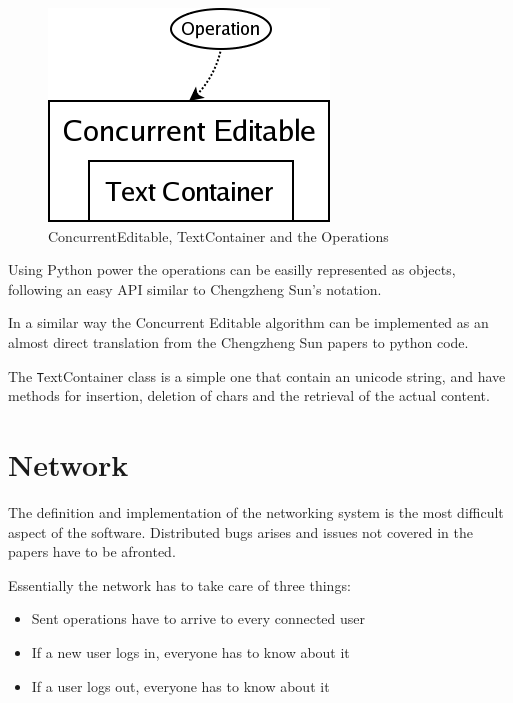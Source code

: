 \documentclass{report}
\begin{document}
\begin{figure}[htbp]
 \begin{center}
    \includegraphics[angle=0,width=0.5\linewidth]{schemas/concurrent_editable.png}
 \end{center}
 \caption{ConcurrentEditable, TextContainer and the Operations}
 \label{fig:concurrenteditable}
\end{figure}


Using Python power the operations can be easilly represented as objects, following an easy API similar to Chengzheng Sun's notation.

In a similar way the Concurrent Editable algorithm can be implemented as an almost direct translation from the Chengzheng Sun papers to python code.

The {\texttt TextContainer } class is a simple one that contain an unicode string, and have methods for insertion, deletion of chars and the retrieval of the actual content.
\section{Network}

The definition and implementation of the networking system is the most difficult aspect of the software. Distributed bugs arises and issues not covered in the papers have to be afronted.

Essentially the network has to take care of three things:
\begin{itemize}
\item Sent operations have to arrive to every connected user
\item If a new user logs in, everyone has to know about it
\item If a user logs out, everyone has to know about it
\end{itemize}
\end{document}
